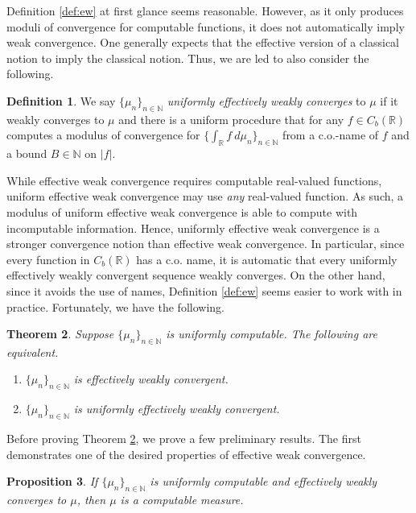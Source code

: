 \documentclass{amsart}
\newcommand{\R}{\mathbb{R}}
\newcommand{\N}{\mathbb{N}}
\newcommand{\M}{\mathcal{M}}
\newtheorem{theorem}{Theorem}[section]
\newtheorem{proposition}[theorem]{Proposition}
\theoremstyle{definition}
\newtheorem{definition}[theorem]{Definition}
\numberwithin{equation}{section}
\begin{document}
Definition \ref{def:ew} at first glance seems reasonable.  However, as it only produces moduli of convergence for computable functions, it does not automatically imply weak convergence.  One generally expects that the 
effective version of a classical notion to imply the classical notion.  Thus, we are led to also consider the following.

\begin{definition}\label{def:uew}
We say $\{\mu_n\}_{n\in\N}$ \emph{uniformly effectively weakly converges} to $\mu$ if it weakly converges to $\mu$ 
and there is a uniform procedure that for any $f \in C_b(\R)$ computes a modulus of convergence for 
$\{\int_\R f\ d\mu_n\}_{n \in \N}$ from a c.o.-name of $f$ and a bound $B \in \N$ on $|f|$.
\end{definition}

While effective weak convergence requires computable real-valued functions, uniform effective weak convergence may use \emph{any} real-valued function. As such, a modulus of uniform effective weak convergence is able to compute with incomputable information. Hence, uniformly effective weak convergence is a stronger convergence notion than effective weak convergence.  In particular, since every function in $C_b(\R)$ has a c.o. name, it is automatic that every uniformly effectively weakly convergent sequence weakly converges.  
On the other hand, since it avoids the use of names, Definition \ref{def:ew} seems easier to work with in practice.  
Fortunately, we have the following.

\begin{theorem}\label{thm:ewc.equiv}
Suppose $\{\mu_n\}_{n\in\N}$ is uniformly computable. The following are equivalent.
	\begin{enumerate}
		\item $\{\mu_n\}_{n\in\N}$ is effectively weakly convergent.
		\item $\{\mu_n\}_{n\in\N}$ is uniformly effectively weakly convergent.
	\end{enumerate}
\end{theorem}

Before proving Theorem \ref{thm:ewc.equiv}, we prove a few preliminary results.  The first demonstrates one of the desired properties of effective weak convergence.  

\begin{proposition}\label{prop:uew}
If $\{\mu_n\}_{n\in\N}$ is uniformly computable and effectively weakly converges to $\mu$, then $\mu$ is a computable measure.
\end{proposition}
\end{document}
